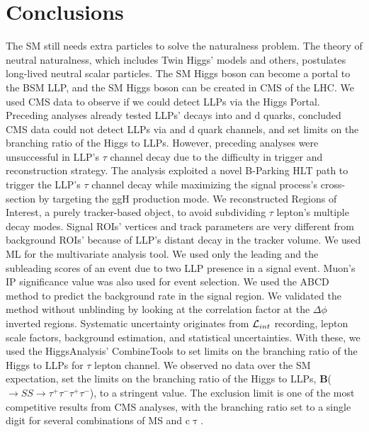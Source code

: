 \clearpage
\chapter{Conclusions}\label{sec:conclusions}
The SM still needs extra particles to solve the naturalness problem.
The theory of neutral naturalness, which includes Twin Higgs' models and others, postulates long-lived neutral scalar particles.
The SM Higgs boson can become a portal to the BSM LLP, and the SM Higgs boson can be created in CMS of the LHC.
We used CMS data to observe if we could detect LLPs via the Higgs Portal.
Preceding analyses already tested LLPs' decays into \PQb and d quarks, concluded CMS data could not detect LLPs via \PQb and d quark channels, and set limits on the branching ratio of the Higgs to LLPs.
However, preceding analyses were unsuccessful in LLP's $\tau$ channel decay due to the difficulty in trigger and reconstruction strategy.
The analysis exploited a novel B-Parking HLT path to trigger the LLP's $\tau$ channel decay while maximizing the signal process's cross-section by targeting the ggH production mode.
We reconstructed Regions of Interest, a purely tracker-based object, to avoid subdividing $\tau$ lepton's multiple decay modes.
Signal ROIs' vertices and track parameters are very different from background ROIs' because of LLP's distant decay in the tracker volume.
We used ML for the multivariate analysis tool.
We used only the leading and the subleading scores of an event due to two LLP presence in a signal event.
Muon's IP significance value was also used for event selection.
We used the ABCD method to predict the background rate in the signal region.
We validated the method without unblinding by looking at the correlation factor at the $\Delta\phi$ inverted regions.
Systematic uncertainty originates from $\mathcal{L}_{int}$ recording, lepton scale factors, background estimation, and statistical uncertainties.
With these, we used the HiggsAnalysis' CombineTools to set limits on the branching ratio of the Higgs to LLPs for $\tau$ lepton channel.
We observed no data over the SM expectation, set the limits on the branching ratio of the Higgs to LLPs, \textbf{B}(\PH$\to SS \to \tau^{+}\tau^{-}\tau^{+}\tau^{-}$), to a stringent value.
The exclusion limit is one of the most competitive results from CMS analyses, with the branching ratio set to a single digit for several combinations of MS and c$\uptau$.
